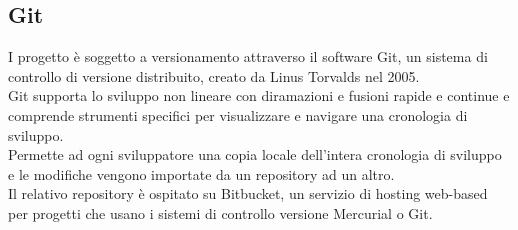 	\subsection{Git}
	\label{tec:git}
	I progetto è soggetto a versionamento attraverso il software Git, un sistema di controllo di versione distribuito, creato da Linus Torvalds nel 2005. \\
Git supporta lo sviluppo non lineare con diramazioni e fusioni rapide e continue
e comprende strumenti specifici per visualizzare e navigare una cronologia di sviluppo.\\
Permette ad ogni sviluppatore una copia locale dell’intera cronologia di sviluppo e le
modifiche vengono importate da un repository ad un altro. \\
Il relativo repository è ospitato su Bitbucket, un servizio di hosting web-based
per progetti che usano i sistemi di controllo versione Mercurial o Git.
	
